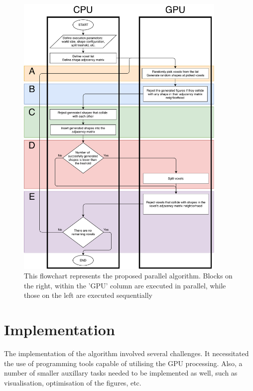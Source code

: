 \documentclass[12pt, oneside]{report}
\begin{document}
\begin{figure}[H]
  \centering
	\label{GPURSABlockDiagramPdf}
	\includegraphics[width=0.9\textwidth,height=0.9\textheight,keepaspectratio]{Images/GPURSA/GPUDiagram1.pdf}
	\caption{This flowchart represents the proposed parallel algorithm. \newline
		Blocks on the right, within the 'GPU' column are executed in parallel, while those on the left are executed sequentially}
\end{figure}

\section {Implementation}

The implementation of the algorithm involved several challenges. It necessitated the use of programming tools capable of utilising the GPU processing. Also, a number of smaller auxillary tasks needed to be implemented as well, such as visualisation, optimisation of the figures, etc.
\end{document}
